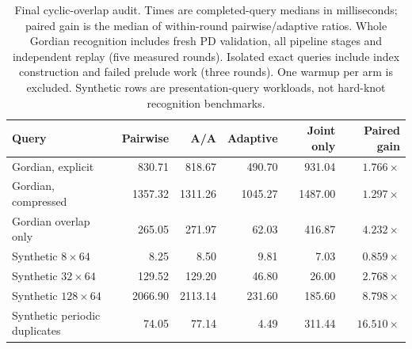 \begin{table}[htbp]
\centering\small
\begin{tabular}{lrrrrr}
\toprule
Query & Pairwise & A/A & Adaptive & Joint only & Paired gain\\
\midrule
Gordian, explicit & 830.71 & 818.67 & 490.70 & 931.04 & $1.766\times$\\
Gordian, compressed & 1357.32 & 1311.26 & 1045.27 & 1487.00 & $1.297\times$\\
Gordian overlap only & 265.05 & 271.97 & 62.03 & 416.87 & $4.232\times$\\
Synthetic $8\times64$ & 8.25 & 8.50 & 9.81 & 7.03 & $0.859\times$\\
Synthetic $32\times64$ & 129.52 & 129.20 & 46.80 & 26.00 & $2.768\times$\\
Synthetic $128\times64$ & 2066.90 & 2113.14 & 231.60 & 185.60 & $8.798\times$\\
Synthetic periodic duplicates & 74.05 & 77.14 & 4.49 & 311.44 & $16.510\times$\\
\bottomrule
\end{tabular}
\caption{Final cyclic-overlap audit. Times are completed-query medians in milliseconds; paired gain is the median of within-round pairwise/adaptive ratios. Whole Gordian recognition includes fresh PD validation, all pipeline stages and independent replay (five measured rounds). Isolated exact queries include index construction and failed prelude work (three rounds). One warmup per arm is excluded. Synthetic rows are presentation-query workloads, not hard-knot recognition benchmarks.}
\label{tab:cyclic-overlap-audit}
\end{table}
